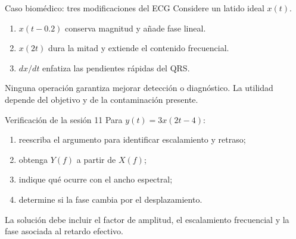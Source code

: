 \documentclass[
  ignorenonframetext,
  aspectratio=169,
  spanish,
]{beamer}
\providecommand{\tightlist}{%
  \setlength{\itemsep}{0pt}\setlength{\parskip}{0pt}}
\begin{document}
\begin{frame}{Caso biomédico: tres modificaciones del ECG}
  \protect{}\label{caso-biomuxe9dico-tres-modificaciones-del-ecg}
  Considere un latido ideal \(x(t)\).

  \begin{enumerate}
    \tightlist
    \item
          \(x(t-0.2)\) conserva magnitud y añade fase lineal.
    \item
          \(x(2t)\) dura la mitad y extiende el contenido frecuencial.
    \item
          \(dx/dt\) enfatiza las pendientes rápidas del QRS.
  \end{enumerate}

  \begin{tcolorbox}[enhanced jigsaw, arc=.35mm, bottomrule=.15mm, bottomtitle=1mm, breakable, colback=white, colbacktitle=quarto-callout-warning-color!10!white, colframe=quarto-callout-warning-color-frame, coltitle=black, left=2mm, leftrule=.75mm, opacityback=0, opacitybacktitle=0.6, rightrule=.15mm, title=\textcolor{quarto-callout-warning-color}{\faExclamationTriangle}\hspace{0.5em}{Advertencia}, titlerule=0mm, toprule=.15mm, toptitle=1mm]

    Ninguna operación garantiza mejorar detección o diagnóstico. La utilidad
    depende del objetivo y de la contaminación presente.

  \end{tcolorbox}
\end{frame}

\begin{frame}{Verificación de la sesión 11}
  \protect{}\label{verificaciuxf3n-de-la-sesiuxf3n-11}
  Para \(y(t)=3x(2t-4)\):

  \begin{enumerate}
    \tightlist
    \item
          reescriba el argumento para identificar escalamiento y retraso;
    \item
          obtenga \(Y(f)\) a partir de \(X(f)\);
    \item
          indique qué ocurre con el ancho espectral;
    \item
          determine si la fase cambia por el desplazamiento.
  \end{enumerate}

  \begin{tcolorbox}[enhanced jigsaw, arc=.35mm, bottomrule=.15mm, bottomtitle=1mm, breakable, colback=white, colbacktitle=quarto-callout-tip-color!10!white, colframe=quarto-callout-tip-color-frame, coltitle=black, left=2mm, leftrule=.75mm, opacityback=0, opacitybacktitle=0.6, rightrule=.15mm, title=\textcolor{quarto-callout-tip-color}{\faLightbulb}\hspace{0.5em}{Criterio de logro}, titlerule=0mm, toprule=.15mm, toptitle=1mm]

    La solución debe incluir el factor de amplitud, el escalamiento
    frecuencial y la fase asociada al retardo efectivo.

  \end{tcolorbox}
\end{frame}
\end{document}
